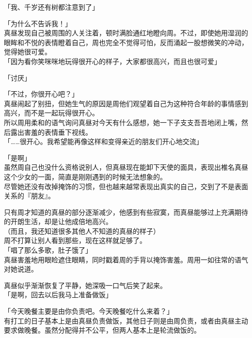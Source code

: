 「我、千岁还有树都注意到了」

「为什么不告诉我！」\\

真昼发现自己被周围的人关注着，顿时满脸通红地瞪向周。不过，即使她用湿润的眼眸和不悦的表情瞪着自己，周也完全不觉得可怕，反而涌起一股想微笑的冲动，觉得她很可爱。\\

「因为看你笑咪咪地玩得很开心的样子，大家都很高兴，而且也很可爱」

「讨厌」

「不过，你很开心吧？」\\

真昼闹起了别扭，但她生气的原因是周他们观望着自己为这种符合年龄的事情感到高兴，而不是一起玩得很开心。\\

所以周用柔和的语气询问真昼对今天有什么感想，她一下子支支吾吾地闭上嘴，然后露出害羞的表情垂下视线。\\

「……很开心。我希望能再像这样和变得亲近的朋友们开心地交流」

「是啊」\\

虽然周自己也没什么资格说别人，但真昼现在能卸下天使的面具，表现出椎名真昼这个少女的一面，简直是刚刚遇到的时候无法想象的。\\

尽管她还没有改掉掩饰的习惯，但也越来越常表现出真实的自己，交到了不是表面关系的『朋友』。

只有周才知道的真昼的部分逐渐减少，他感到有些寂寞，而真昼能够过上充满期待的开朗生活，却是让他成倍地高兴。\\

（而且，我还知道很多其他人不知道的真昼的样子）\\

周不打算让别人看到那些，现在这样就足够了。\\

「唱了那么多歌，肚子饿了」\\

真昼害羞地用眼睑遮住眼睛，同时戳着周的手背以掩饰害羞。周用一如往常的语气对她说道。

真昼似乎渐渐恢复了平静，她深吸一口气后笑了起来。\\

「是啊，回去以后我马上准备做饭」

「今天晚餐主要是由你负责吧。今天晚餐吃什么来着？」\\

有打工的日子基本上是由真昼负责做饭，其他日子则是由周负责，或者由真昼主动要求做晚餐。虽然分配得并不公平，但两人基本上是轮流做饭的。

